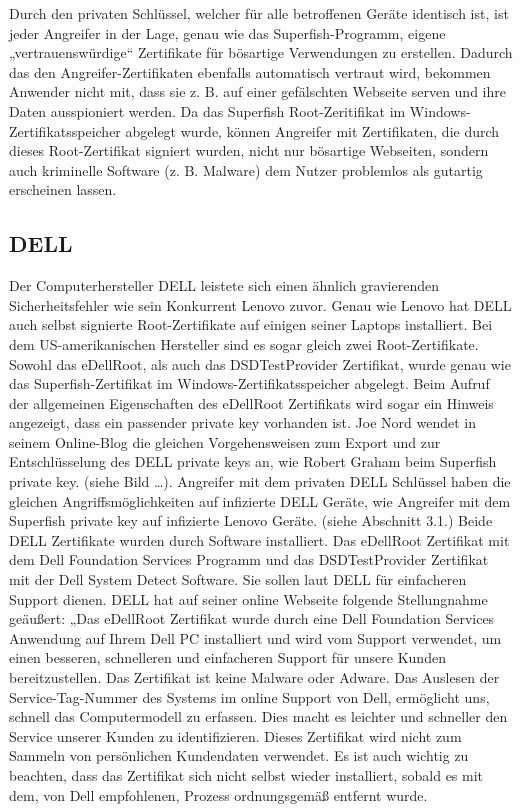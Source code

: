 Durch den privaten Schlüssel, welcher für alle betroffenen Geräte identisch ist, ist jeder Angreifer in der Lage, genau wie das Superfish-Programm, eigene „vertrauenswürdige“ Zertifikate für bösartige Verwendungen zu erstellen. Dadurch das den Angreifer-Zertifikaten ebenfalls automatisch vertraut wird, bekommen Anwender nicht mit, dass sie z. B. auf einer gefälschten Webseite serven und ihre Daten ausspioniert werden. Da das Superfish Root-Zeritifikat im Windows-Zertifikatsspeicher abgelegt wurde, können Angreifer mit Zertifikaten, die durch dieses Root-Zertifikat signiert wurden, nicht nur bösartige Webseiten, sondern auch kriminelle Software (z. B. Malware) dem Nutzer problemlos als gutartig erscheinen lassen.

\subsection{DELL}
Der Computerhersteller DELL leistete sich einen ähnlich gravierenden Sicherheitsfehler wie sein Konkurrent Lenovo zuvor. Genau wie Lenovo hat DELL auch selbst signierte Root-Zertifikate auf einigen seiner Laptops installiert. Bei dem US-amerikanischen Hersteller sind es sogar gleich zwei Root-Zertifikate. Sowohl das eDellRoot, als auch das DSDTestProvider Zertifikat, wurde genau wie das Superfish-Zertifikat im Windows-Zertifikatsspeicher abgelegt. Beim Aufruf der allgemeinen Eigenschaften des eDellRoot Zertifikats wird sogar ein Hinweis angezeigt, dass ein passender private key vorhanden ist. Joe Nord wendet in seinem Online-Blog die gleichen Vorgehensweisen zum Export und zur Entschlüsselung des DELL private keys an, wie Robert Graham beim Superfish private key.  (siehe Bild …). Angreifer mit dem privaten DELL Schlüssel haben die gleichen Angriffsmöglichkeiten auf infizierte DELL Geräte, wie Angreifer mit dem Superfish private key auf infizierte Lenovo Geräte. (siehe Abschnitt 3.1.)
Beide DELL Zertifikate wurden durch Software installiert. Das eDellRoot Zertifikat mit dem Dell Foundation Services Programm und das DSDTestProvider Zertifikat mit der Dell System Detect Software. 
Sie sollen laut DELL für einfacheren Support dienen. 
DELL hat auf seiner online Webseite folgende Stellungnahme geäußert: „Das eDellRoot Zertifikat wurde durch eine Dell Foundation Services Anwendung auf Ihrem Dell PC installiert und wird vom Support verwendet, um einen besseren, schnelleren und einfacheren Support für unsere Kunden bereitzustellen. Das Zertifikat ist keine Malware oder Adware. Das Auslesen der Service-Tag-Nummer des Systems im online Support von Dell, ermöglicht uns, schnell das Computermodell zu erfassen. Dies macht es leichter und schneller den Service unserer Kunden zu identifizieren. Dieses Zertifikat wird nicht zum Sammeln von persönlichen Kundendaten verwendet. Es ist auch wichtig zu beachten, dass das Zertifikat sich nicht selbst wieder installiert, sobald es mit dem, von Dell empfohlenen, Prozess ordnungsgemäß entfernt wurde. 
